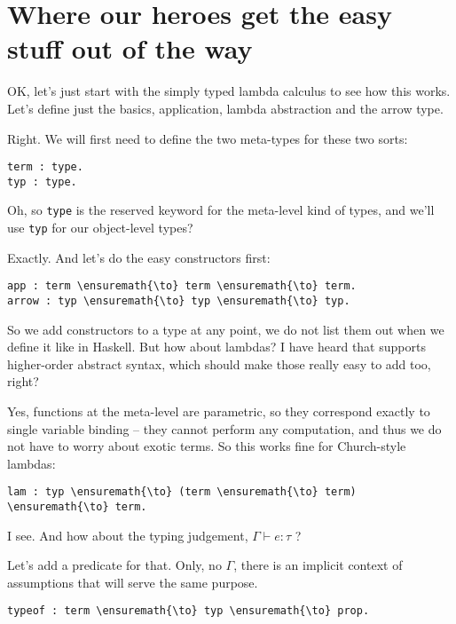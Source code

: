 \section{Where our heroes get the easy stuff out of the
way}\label{where-our-heroes-get-the-easy-stuff-out-of-the-way}

 OK, let's just start with the simply typed lambda calculus to see
how this works. Let's define just the basics, application, lambda
abstraction and the arrow type.

 Right. We will first need to define the two meta-types for these
two sorts:

\begin{verbatim}
term : type.
typ : type.
\end{verbatim}

 Oh, so \texttt{type} is the reserved keyword for the meta-level
kind of types, and we'll use \texttt{typ} for our object-level types?

 Exactly. And let's do the easy constructors first:

\begin{verbatim}
app : term \ensuremath{\to} term \ensuremath{\to} term.
arrow : typ \ensuremath{\to} typ \ensuremath{\to} typ.
\end{verbatim}

 So we add constructors to a type at any point, we do not list
them out when we define it like in Haskell. But how about lambdas? I
have heard that \lamprolog supports higher-order abstract syntax, which
should make those really easy to add too, right?

 Yes, functions at the meta-level are parametric, so they
correspond exactly to single variable binding -- they cannot perform any
computation, and thus we do not have to worry about exotic terms. So
this works fine for Church-style lambdas:

\begin{verbatim}
lam : typ \ensuremath{\to} (term \ensuremath{\to} term) \ensuremath{\to} term.
\end{verbatim}

 I see. And how about the typing judgement,
\(\Gamma \vdash e : \tau\) ?

 Let's add a predicate for that. Only, no \(\Gamma\), there is an
implicit context of assumptions that will serve the same purpose.

\begin{verbatim}
typeof : term \ensuremath{\to} typ \ensuremath{\to} prop.
\end{verbatim}

